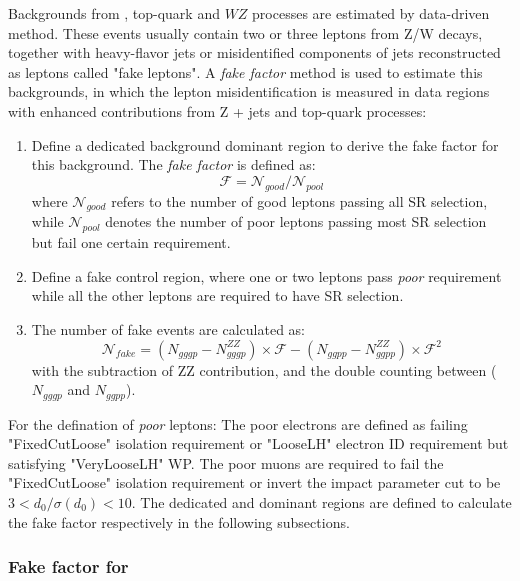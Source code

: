 Backgrounds from \Zjet, top-quark and $WZ$ processes are estimated by data-driven method.
These events usually contain two or three leptons from Z/W decays, together with heavy-flavor jets or misidentified components of jets reconstructed as leptons called "fake leptons".
A \textit{fake factor} method is used to estimate this backgrounds, in which the lepton misidentification is measured in data regions 
with enhanced contributions from Z + jets and top-quark processes:
\begin{enumerate}
	\item Define a dedicated background dominant region to derive the fake factor for this background. 
The \textit{fake factor} is defined as:
\begin{equation}
	\mathcal{F} = \mathcal{N}_{good} / \mathcal{N}_{pool}
\end{equation}
where $\mathcal{N}_{good}$ refers to the number of good leptons passing all SR selection, while $\mathcal{N}_{pool}$ denotes the number of poor leptons passing most SR selection but fail one certain requirement.
	\item Define a \lllljj fake control region, where one or two leptons pass \textit{poor} requirement while all the other leptons are required to have SR selection.
	\item The number of fake events are calculated as:
\begin{equation}
	\mathcal{N}_{fake} = \left( N_{gggp} - N_{gggp}^{ZZ} \right) \times \mathcal{F} - \left( N_{ggpp} - N_{ggpp}^{ZZ} \right) \times \mathcal{F}^{2}
\end{equation}
with the subtraction of ZZ contribution, and the double counting between ($N_{gggp}$ and $N_{ggpp}$).
\end{enumerate}

For the defination of \textit{poor} leptons:
The poor electrons are defined as failing "FixedCutLoose" isolation requirement or "LooseLH" electron ID requirement but satisfying "VeryLooseLH" WP.
The poor muons are required to fail the "FixedCutLoose" isolation requirement or invert the impact parameter cut to be $3 < d_{0}/\sigma(d_{0}) < 10$.
The dedicated \Zjet and \ttbar dominant regions are defined to calculate the fake factor respectively in the following subsections.

\subsubsection{Fake factor for \Zjet}

